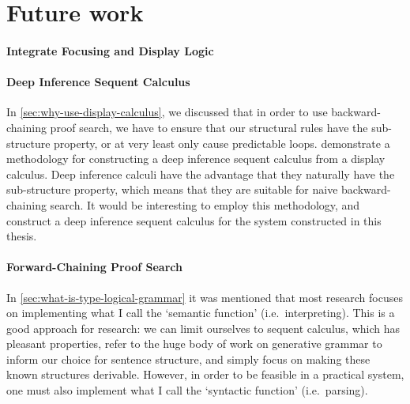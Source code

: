 \documentclass[a4paper]{article}
\begin{document}







%
%
%
%


\section{Future work}

\paragraph*{Integrate Focusing and Display Logic}

\paragraph*{Deep Inference Sequent Calculus}
In \autoref{sec:why-use-display-calculus}, we discussed that in order
to use backward-chaining proof search, we have to ensure that our
structural rules have the sub-structure property, or at very least
only cause predictable loops. \citet{gore2014} demonstrate a
methodology for constructing a deep inference sequent calculus from a
display calculus. Deep inference calculi have the advantage that they
naturally have the sub-structure property, which means that they are
suitable for naive backward-chaining search. It would be interesting
to employ this methodology, and construct a deep inference sequent
calculus for the system constructed in this thesis.

\paragraph*{Forward-Chaining Proof Search}
In \autoref{sec:what-is-type-logical-grammar} it was mentioned that
most research focuses on implementing what I call the `semantic
function' (i.e.\ interpreting). This is a good approach for research:
we can limit ourselves to sequent calculus, which has pleasant
properties, refer to the huge body of work on generative grammar to
inform our choice for sentence structure, and simply focus on making
these known structures derivable. However, in order to be feasible in
a practical system, one must also implement what I call the `syntactic
function' (i.e.\ parsing).
\end{document}

